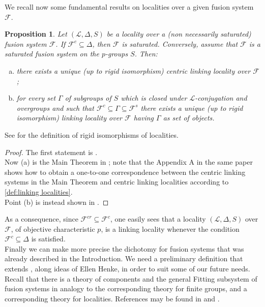 \documentclass{amsart}
\numberwithin{equation}{section}
\newtheorem{prop}[equation]{Proposition}
\theoremstyle{definition}
\theoremstyle{subresult}
\theoremstyle{caseresult}
\newcommand{\F}{\mathcal{F}}
\renewcommand{\L}{\mathcal{L}}
\newcommand{\<}{\langle}
\renewcommand{\>}{\rangle}
\begin{document}
We recall now some fundamental results on localities over a given fusion system $\F$.
\begin{prop}
    Let $(\L,\Delta,S)$ be a locality over a (non necessarily saturated) fusion system $\F$. If $\F^c \subseteq \Delta$, then $\F$ is saturated.   Conversely, assume that $\F$ is a saturated fusion system on the $p$-groups $S$. Then:
    \begin{enumerate}[(a)]
        \item there exists a unique (up to rigid isomorphism) centric linking locality over $\F$;
        \item for every set $\Gamma$ of subgroups of $S$ which is closed under $\L$-conjugation and overgroups and such that $\F^c \subseteq \Gamma \subseteq \F^s$ there exists a unique (up to rigid isomorphism) linking locality over $\F$ having $\Gamma$ as set of objects.
    \end{enumerate}
\end{prop}
See \cite[Definition 3.5]{Chermak:2013} for the definition of rigid isomorphisms of localities.
\begin{proof}
    The first statement is \cite[Proposition 2.18(a)]{Chermak:2013}.\\
    Now (a) is the Main Theorem in \cite{Chermak:2013}; note that the Appendix A in the same paper shows how to obtain a one-to-one correspondence between the centric linking systems in the Main Theorem and centric linking localities according to \ref{def:linking localities}.\\
    Point (b) is instead shown in \cite[Theorem A]{Henke:2015}.
\end{proof}

As a consequence, since $\F^{cr} \subseteq \F^c$, one easily sees that a locality $(\L,\Delta,S)$ over $\F$, of objective characteristic $p$, is a linking locality whenever the condition $\F^c \subseteq \Delta$ is satisfied.\\

Finally we can make more precise the dichotomy for fusion systems that was already described in the Introduction. We need a preliminary definition that extends \cite[Definition 14.1]{Aschbacher/Kessar/Oliver:2011}, along ideas of Ellen  Henke, in order to suit some of our future needs. Recall that there is a theory of components and the general Fitting subsystem of fusion systems in analogy to the corresponding theory for finite groups, and a corresponding theory for localities. References may be found in \cite[Chapter II.9]{Aschbacher/Kessar/Oliver:2011} and \cite{Henke:2025}.
\end{document}
